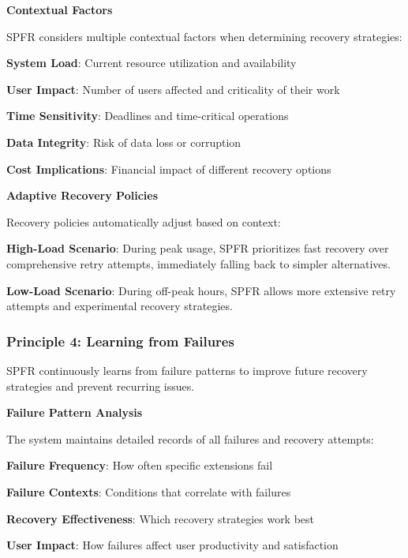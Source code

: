 \textbf{Contextual Factors}

SPFR considers multiple contextual factors when determining recovery strategies:

\begin{compactlist}
    \item \textbf{System Load}: Current resource utilization and availability
    \item \textbf{User Impact}: Number of users affected and criticality of their work
    \item \textbf{Time Sensitivity}: Deadlines and time-critical operations
    \item \textbf{Data Integrity}: Risk of data loss or corruption
    \item \textbf{Cost Implications}: Financial impact of different recovery options
\end{compactlist}

\textbf{Adaptive Recovery Policies}

Recovery policies automatically adjust based on context:

\begin{successbox}
\textbf{High-Load Scenario}: During peak usage, SPFR prioritizes fast recovery over comprehensive retry attempts, immediately falling back to simpler alternatives.

\textbf{Low-Load Scenario}: During off-peak hours, SPFR allows more extensive retry attempts and experimental recovery strategies.
\end{successbox}

\subsubsection{Principle 4: Learning from Failures}

SPFR continuously learns from failure patterns to improve future recovery strategies and prevent recurring issues.

\textbf{Failure Pattern Analysis}

The system maintains detailed records of all failures and recovery attempts:

\begin{compactlist}
    \item \textbf{Failure Frequency}: How often specific extensions fail
    \item \textbf{Failure Contexts}: Conditions that correlate with failures
    \item \textbf{Recovery Effectiveness}: Which recovery strategies work best
    \item \textbf{User Impact}: How failures affect user productivity and satisfaction
\end{compactlist}

